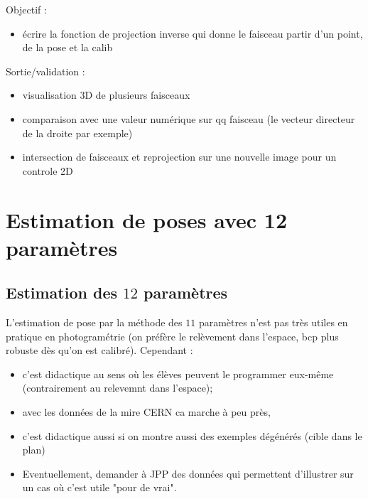 Objectif :
\begin{itemize}
   \item écrire la fonction de projection inverse qui donne le faisceau partir d'un point, de la pose et la calib
\end{itemize}

Sortie/validation :

\begin{itemize}
   \item visualisation 3D de plusieurs faisceaux
   \item comparaison avec une valeur numérique sur qq faisceau (le vecteur directeur de la droite par exemple)
   \item intersection de faisceaux et reprojection sur une nouvelle image pour un controle 2D
\end{itemize}



\section{Estimation de poses avec 12 paramètres}

\subsection{Estimation des $12$ paramètres}

L'estimation de pose par la méthode des $11$ paramètres n'est pas très utiles en pratique
en photogramétrie (on préfère le relèvement dans l'espace, bcp plus robuste dès qu'on est
calibré). Cependant :


\begin{itemize}
    \item c'est didactique au sens où les élèves peuvent le programmer eux-même (contrairement au 
	    relevemnt dans l'espace);

   \item avec les données de la mire CERN ca marche à peu près,

   \item c'est didactique aussi si on montre aussi des exemples dégénérés (cible dans le plan)

   \item Eventuellement, demander à JPP des données qui permettent d'illustrer sur un cas où c'est utile "pour de vrai".
\end{itemize}

